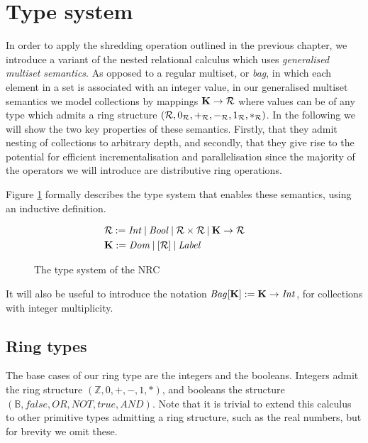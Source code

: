 \section{Type system} {

In order to apply the shredding operation outlined in the previous chapter, we introduce a variant of the nested relational calculus which uses \textit{generalised multiset semantics}. As opposed to a regular multiset, or \textit{bag}, in which each element in a set is associated with an integer value, in our generalised multiset semantics we model collections by mappings $ \mathbf{K} \rightarrow \mathcal{R} $ where values can be of any type which admits a ring structure $ (\mathcal{R},0_{\mathcal{R}},+_{\mathcal{R}},-_{\mathcal{R}},1_{\mathcal{R}},*_{\mathcal{R}}) $. In the following we will show the two key properties of these semantics. Firstly, that they admit nesting of collections to arbitrary depth, and secondly, that they give rise to the potential for efficient incrementalisation and parallelisation since the majority of the operators we will introduce are distributive ring operations.

Figure \ref{nrctypes} formally describes the type system that enables these semantics, using an inductive definition.

\begin{figure}
\begin{equation*}
\begin{aligned}
&\mathcal{R} := \textrm{\textit{Int}} \: | \: \textrm{\textit{Bool}} \: | \: \mathcal{R} \times  \mathcal{R} \: | \: \mathbf{K} \rightarrow \mathcal{R} \\
&\mathbf{K} := \textrm{\textit{Dom}} \: | \:  [\mathcal{R}]  \: | \: \textrm{\textit{Label}} \\
\end{aligned}
\qquad
\begin{aligned}
\end{aligned}
\end{equation*}
\caption{The type system of the NRC}
\label{nrctypes}
\end{figure}

It will also be useful to introduce the notation $\textrm{\textit{Bag}}[\mathbf{K}] := \mathbf{K} \rightarrow \textrm{\textit{Int}}$, for collections with integer multiplicity.

\subsection{Ring types} {
The base cases of our ring type are the integers and the booleans. Integers admit the ring structure $(\mathbb{Z},0,+,-,1,*)$, and booleans the structure $(\mathbb{B}, false,OR,NOT,true,AND)$. Note that it is trivial to extend this calculus to other primitive types admitting a ring structure, such as the real numbers, but for brevity we omit these. 

}}

